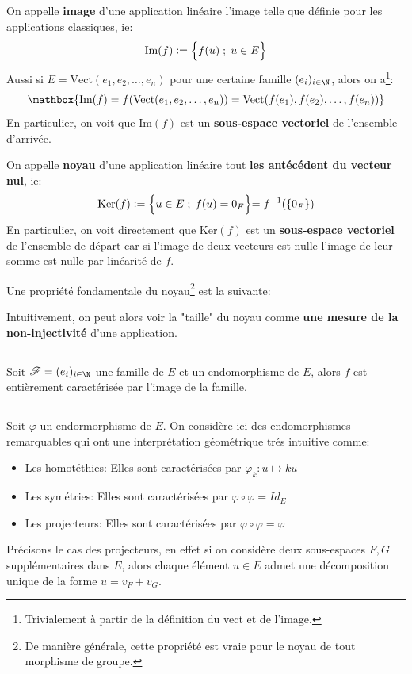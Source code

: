 \subsection*{}
On appelle \textbf{image} d'une application linéaire l'image telle que définie pour les applications classiques, ie:
\[
      \text{Im}(f) := \Bigl\{ f(u) \; ; \; u \in E \Bigl\}
\]
Aussi si \(E = \text{Vect}(e_1, e_2, \ldots, e_n)\) pour une certaine famille \((e_i)_{i\in \N}\), alors on a\footnote[5]{Trivialement à partir de la définition du vect et de l'image.}:
\[
      \mathbox{\text{Im}(f) = f(\text{Vect}(e_1, e_2, \ldots, e_n)) = \text{Vect}(f(e_1), f(e_2), \ldots, f(e_n))}
\]
En particulier, on voit que \(\text{Im}(f)\) est un \textbf{sous-espace vectoriel} de l'ensemble d'arrivée.\<

On appelle \textbf{noyau} d'une application linéaire tout \textbf{les antécédent du vecteur nul}, ie:
\[
      \text{Ker}(f) := \Bigl\{ u \in E \; ; \; f(u) = 0_F \Bigl\} = f^{-1}(\{0_F\})
\]
En particulier, on voit directement que \(\text{Ker}(f)\) est un \textbf{sous-espace vectoriel} de l'ensemble de départ car si l'image de deux vecteurs est nulle l'image de leur somme est nulle par linéarité de \(f\).\<

Une propriété fondamentale du noyau\footnote[6]{De manière générale, cette propriété est vraie pour le noyau de tout morphisme de groupe.} est la suivante:
\begin{center}
\end{center}
Intuitivement, on peut alors voir la "taille" du noyau comme \textbf{une mesure de la non-injectivité} d'une application.
\pagebreak

\subsection*{}
Soit \(\mathscr{F} = (e_i)_{i \in \N}\) une famille de \(E\) et un endomorphisme de \(E\), alors \(f\) est entièrement caractérisée par l'image de la famille.

\subsection*{}
Soit \(\varphi\) un endormorphisme de \(E\).\+
On considère ici des endomorphismes remarquables qui ont une interprétation géométrique trés intuitive comme:
\begin{itemize}
   \item Les homotéthies: Elles sont caractérisées par \(\varphi_k : u \longmapsto ku\)
   \item Les symétries: Elles sont caractérisées par \(\varphi \circ \varphi = Id_E\)
   \item Les projecteurs: Elles sont caractérisées par \(\varphi \circ \varphi = \varphi\)
\end{itemize}
Précisons le cas des projecteurs, en effet si on considère deux sous-espaces \(F, G\) supplémentaires dans \(E\), alors chaque élément \(u \in E\) admet une décomposition unique de la forme \(u = v_F + v_G\).\<

